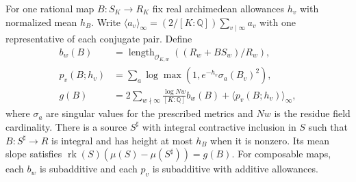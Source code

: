 \begin{lemma}\label{trmean:graph}
For one rational map \(B:S_K\to R_K\) fix real archimedean
allowances \(h_v\) with normalized mean \(h_B\). Write
\(\langle a_v\rangle_\infty=(2/[K:\mathbb Q])\sum_{v\mid\infty}a_v\)
with one representative of each conjugate pair. Define
\[
\begin{aligned}
 b_w(B)&=\operatorname{length}_{\mathcal O_{K,w}}
              ((R_w+BS_w)/R_w),\\
 p_v(B;h_v)&=\sum_a\log\max(1,e^{-h_v}\sigma_a(B_v)^2),\\
 g(B)&=2\sum_{w\nmid\infty}\frac{\log Nw}{[K:\mathbb Q]}b_w(B)
                    +\langle p_v(B;h_v)\rangle_\infty ,
\end{aligned}
\]
where \(\sigma_a\) are singular values for the prescribed metrics
and \(Nw\) is the residue field cardinality. There is a source
\(S^\sharp\) with integral contractive inclusion in \(S\) such that
\(B:S^\sharp\to R\) is integral and has height at most \(h_B\)
when it is nonzero. Its mean slope satisfies
\(\operatorname{rk}(S)(\mu(S)-\mu(S^\sharp))=g(B)\).
For composable maps, each \(b_w\) is subadditive and each \(p_v\)
is subadditive with additive allowances.
\end{lemma}

